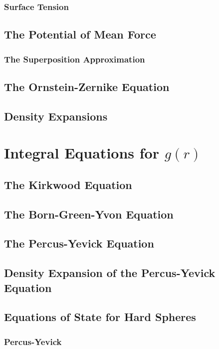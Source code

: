 \documentclass[a4paper,11pt]{article}
\begin{document}
\subsubsection{Surface Tension}
\subsection{The Potential of Mean Force}
\subsubsection{The Superposition Approximation}
\subsection{The Ornstein-Zernike Equation}
\subsection{Density Expansions}


\section{Integral Equations for $g(r)$}\label{sec:integral}

\subsection{The Kirkwood Equation}\label{ssec:kirkwood}

\subsection{The Born-Green-Yvon Equation}\label{ssec:born}
\subsection{The Percus-Yevick Equation}
\subsection{Density Expansion of the Percus-Yevick Equation}
\subsection{Equations of State for Hard Spheres}
\subsubsection{Percus-Yevick}
\end{document}
